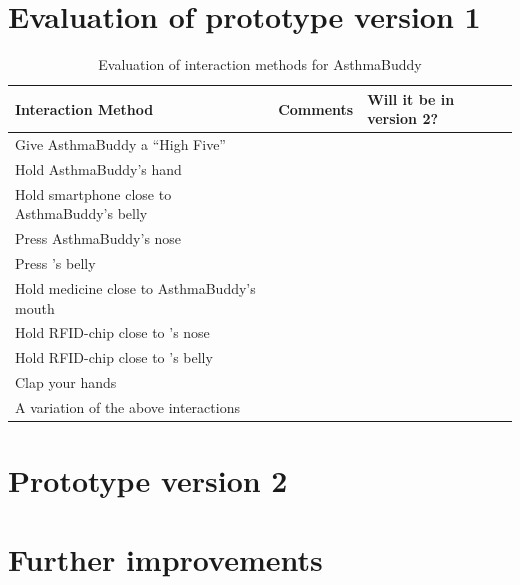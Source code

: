 \section{Evaluation of prototype version 1}

\begin{table}[H]
\begin{tabular}{|p{5.0cm} | p{6.0cm} | p{3.0cm} |}
\hline 
\textbf{Interaction Method} & \textbf{Comments} & \textbf{Will it be in version 2?}\\
\hline
	Give AsthmaBuddy a ``High Five'' & & \\
\hline
	Hold AsthmaBuddy's hand & & \\
\hline
	Hold smartphone close to AsthmaBuddy's belly & & \\
\hline
	Press AsthmaBuddy's nose & & \\
\hline
	Press \buddy{}'s belly & & \\
\hline
	Hold medicine close to AsthmaBuddy's mouth & & \\
\hline
	Hold RFID-chip close to \buddy{}'s nose & & \\
\hline
	Hold RFID-chip close to \buddy{}'s belly & & \\
\hline
	Clap your hands & & \\
\hline
	A variation of the above interactions & & \\
\hline
\end{tabular}
\caption{Evaluation of interaction methods for AsthmaBuddy}
\label{tab:interactioneval}
\end{table}


\section{Prototype version 2}


\section{Further improvements}

 


